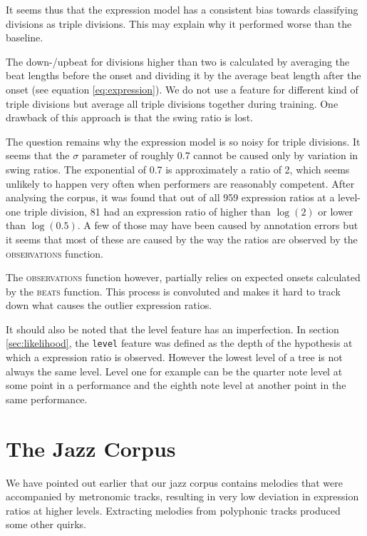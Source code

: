 It seems thus that the expression model has a consistent bias towards classifying divisions as triple divisions. This may explain why it performed worse than the baseline.

The down-/upbeat for divisions higher than two is calculated by averaging the beat lengths before the onset and dividing it by the average beat length after the onset (see equation \ref{eq:expression}). We do not use a feature for different kind of triple divisions but average all triple divisions together during training. One drawback of this approach is that the swing ratio is lost.

The question remains why the expression model is so noisy for triple divisions. It seems that the $\sigma$ parameter of roughly 0.7 cannot be caused only by variation in swing ratios. The exponential of 0.7 is approximately a ratio of 2, which seems unlikely to happen very often when performers are reasonably competent. After analysing the corpus, it was found that out of all 959 expression ratios at a level-one triple division, 81 had an expression ratio of higher than $\log(2)$ or lower than $\log(0.5)$. A few of those may have been caused by annotation errors but it seems that most of these are caused by the way the ratios are observed by the \textsc{observations} function.

The \textsc{observations} function however, partially relies on expected onsets calculated by the \textsc{beats} function. This process is convoluted and makes it hard to track down what causes the outlier expression ratios.

It should also be noted that the level feature has an imperfection. In section \ref{sec:likelihood}, the \texttt{level} feature was defined as the depth of the hypothesis at which a expression ratio is observed. However the lowest level of a tree is not always the same level. Level one for example can be the quarter note level at some point in a performance and the eighth note level at another point in the same performance. 


\section{The Jazz Corpus}

We have pointed out earlier that our jazz corpus contains melodies that were accompanied by metronomic tracks, resulting in very low deviation in expression ratios at higher levels. Extracting melodies from polyphonic tracks produced some other quirks.

